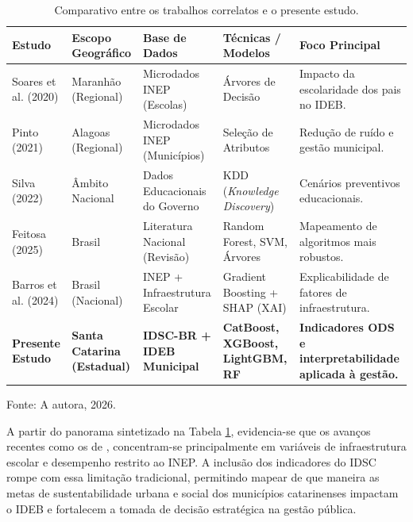 \begin{table}[htbp]
	\centering
	\caption{Comparativo entre os trabalhos correlatos e o presente estudo.}
	\label{tab:trabalhos_correlatos}
	\small
	\renewcommand{\arraystretch}{1.35}
	\begin{tabular}{p{1.8cm} p{2.3cm} p{2.4cm} p{2.3cm} p{4.3cm}}
		\hline
		\textbf{Estudo} & \textbf{Escopo Geográfico} & \textbf{Base de Dados} & \textbf{Técnicas / Modelos} & \textbf{Foco Principal} \\ \hline
		Soares et al. (2020) & Maranhão (Regional) & Microdados INEP (Escolas) & Árvores de Decisão & Impacto da escolaridade dos pais no IDEB. \\ \hline
		Pinto (2021) & Alagoas (Regional) & Microdados INEP (Municípios) & Seleção de Atributos & Redução de ruído e gestão municipal. \\ \hline
		Silva (2022) & Âmbito Nacional & Dados Educacionais do Governo & KDD (\textit{Knowledge Discovery}) & Cenários preventivos educacionais. \\ \hline
		Feitosa (2025) & Brasil & Literatura Nacional (Revisão) & Random Forest, SVM, Árvores & Mapeamento de algoritmos mais robustos. \\ \hline
		Barros et al. (2024) & Brasil (Nacional) & INEP + Infraestrutura Escolar & Gradient Boosting + SHAP (XAI) & Explicabilidade de fatores de infraestrutura. \\ \hline
		\textbf{Presente Estudo} & \textbf{Santa Catarina (Estadual)} & \textbf{IDSC-BR + IDEB Municipal} & \textbf{CatBoost, XGBoost, LightGBM, RF} & \textbf{Indicadores ODS e interpretabilidade aplicada à gestão.} \\ \hline
	\end{tabular}
	
	\vspace{4pt}
	\footnotesize{Fonte: A autora, 2026.}
\end{table}

A partir do panorama sintetizado na Tabela \ref{tab:trabalhos_correlatos}, evidencia-se que os avanços recentes como os de , concentram-se principalmente em variáveis de infraestrutura escolar e desempenho restrito ao INEP. A inclusão dos indicadores do IDSC rompe com essa limitação tradicional, permitindo mapear de que maneira as metas de sustentabilidade urbana e social dos municípios catarinenses impactam o IDEB e fortalecem a tomada de decisão estratégica na gestão pública.